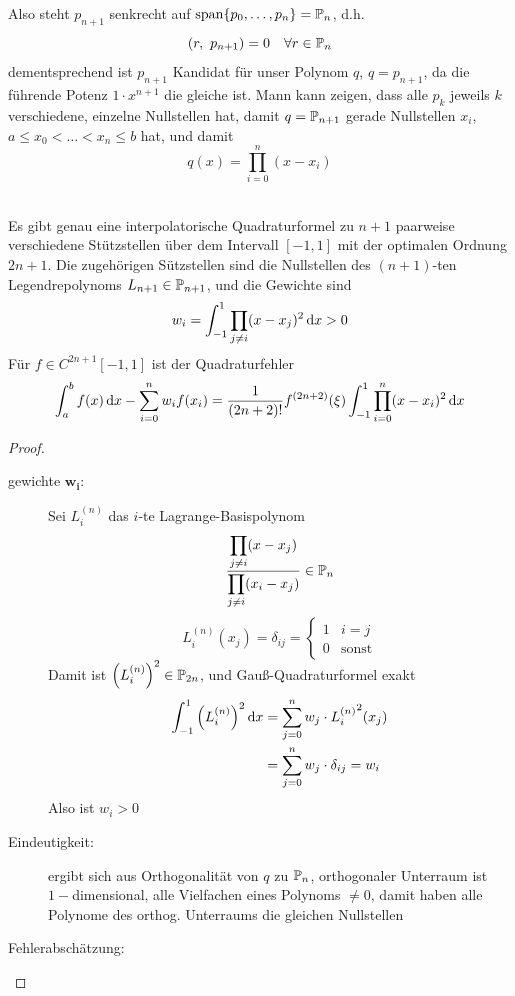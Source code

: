 \documentclass{../Skript}
\begin{document}
{
\def\scp#1#2{\ensuremath{\left(#1,\ #2\right)}}
Also steht $p_{n+1}$ senkrecht auf $\text{span\ensuremath{\left\{ p_0, \dots, p_n \right\}}} = \mathbb{P}_n$, d.h. \[
    \scp r {p_{n+1}} = 0 \largespace\forall r \in \bbP_n
    \]
    dementsprechend ist $p_{n+1}$ Kandidat für unser Polynom $q$, $q = p_{n+1}$, da
    die führende Potenz $1\cdot x^{n+1}$ die gleiche ist. Mann kann zeigen, dass alle
    $p_k$ jeweils $k$ verschiedene, einzelne Nullstellen hat, damit $q=\mathbb{P}_{n+1}$ gerade
    Nullstellen $x_i$, $a\leq x_0 < \dots < x_n \leq b$ hat, und damit \[
        q(x) = \prod_{i=0}^n(x-x_i)\]
\begin{theorem}\hfill\\
    Es gibt genau eine interpolatorische Quadraturformel zu $n+1$ paarweise verschiedene Stützstellen
    über dem Intervall $[-1, 1]$ mit der optimalen Ordnung $2n+1$. Die zugehörigen Sützstellen
    sind die Nullstellen des $(n+1)$-ten Legendrepolynoms $L_{n+1}\in \mathbb{P}_{n+1}$, und die Gewichte sind\[
        w_i = \int_{-1}^1 \prod_{j\neq i}(x-x_j)^2 \mathop{}\!\mathrm{d} x > 0\]
    Für $f\in C^{2n+1}[-1,1]$ ist der Quadraturfehler \[
        \int_a^b f(x)\mathop{}\!\mathrm{d} x - \sum_{i=0}^n w_if(x_i) = \frac{1}{(2n+2)!}f^{(2n+2)}(\xi)\int_{-1}^1\prod_{i=0}^n(x-x_i)^2\mathop{}\!\mathrm{d} x\]
\end{theorem}
\def\LgBp#1#2{\ensuremath{L_{#1}^{(#2)}}}
\begin{proof}
    \begin{description}
        \item[gewichte $\mathbf{w_i}$:]
         Sei $L_i^{(n)}$ das $i$-te Lagrange-Basispolynom \[
        \frac{\dprod_{j\neq i}(x-x_j)}{\dprod_{j\neq i}(x_i-x_j)}\in\Pol{n}\]
    \[L^{(n)}_i(x_j) = \delta_{ij} = \begin{cases}
        1 & i=j\\0&\text{sonst}
    \end{cases}\] Damit ist $\left(L_i^{(n)}\right)^2 \in \Pol{2n}$, und Gauß-Quadraturformel exakt\begin{align*}
        \int_{-1}^1 \left(L_i^{(n)}\right)^2 \diff x &= \sum_{j=0}^n w_j\cdot  {\LgBp{i}{n}}^2(x_j) \\
        &= \sum_{j=0}^n w_j \cdot \delta_{ij} = w_i
    \end{align*}
    Also ist $w_i > 0$
    \item[Eindeutigkeit:]
    ergibt sich aus Orthogonalität von $q$ zu $\Pol{n}$, orthogonaler Unterraum ist $1-$dimensional,
    alle Vielfachen eines Polynoms $\neq 0$, damit haben alle Polynome des orthog. Unterraums
    die gleichen Nullstellen
    \item[Fehlerabschätzung:]

\end{description}
\end{proof}}
\end{document}
